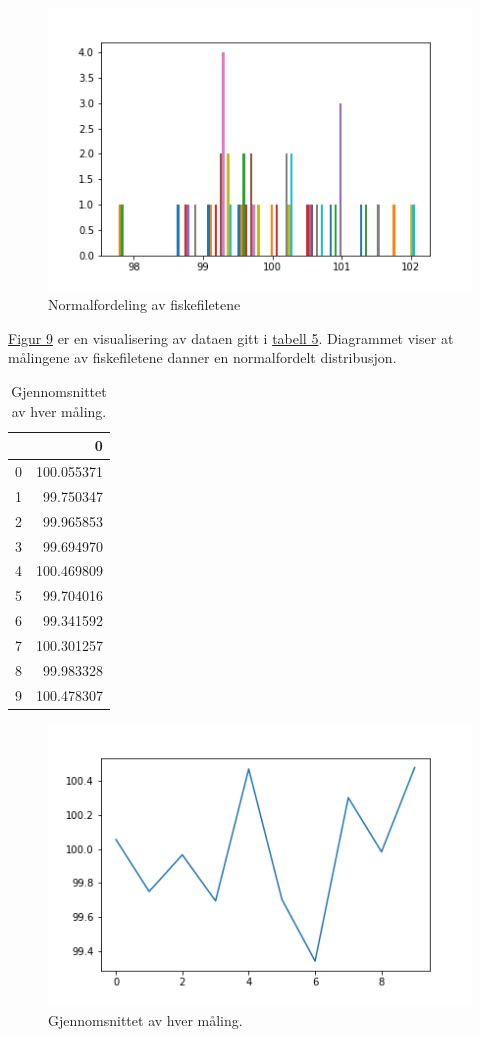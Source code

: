 \documentclass[12pt]{article}
\begin{document}
\begin{figure}[H]
    \centering
    \includegraphics[scale= 1]{norm.png}
    \caption{Normalfordeling av fiskefiletene}
    \label{fig:fig9}
\end{figure}

\hyperref[fig:fig9]{Figur 9} er en visualisering av dataen gitt i \hyperref[tab:tab5]{tabell 5}. Diagrammet viser at målingene av fiskefiletene danner en normalfordelt distribusjon.


\begin{table}[H]
    \centering
    \caption{Gjennomsnittet av hver måling.}
\begin{tabular}{lr}
\toprule
{} &           0 \\
\midrule
0 &  100.055371 \\
1 &   99.750347 \\
2 &   99.965853 \\
3 &   99.694970 \\
4 &  100.469809 \\
5 &   99.704016 \\
6 &   99.341592 \\
7 &  100.301257 \\
8 &   99.983328 \\
9 &  100.478307 \\
\bottomrule
\end{tabular}
    
    \label{tab:tab6}
\end{table}

\begin{figure}[H]
    \centering
    \includegraphics[scale = 1]{gj_plot.png}
    \caption{Gjennomsnittet av hver måling.}
    \label{fig:fig10}
\end{figure}
\end{document}
